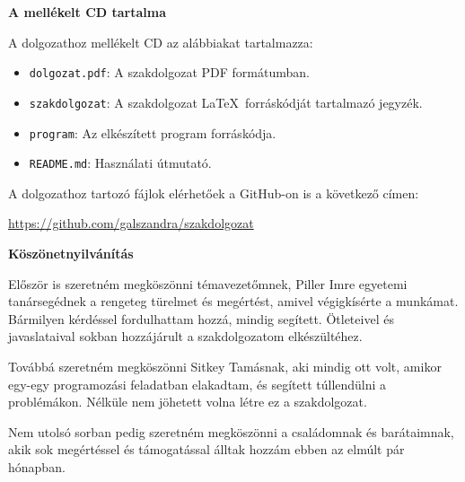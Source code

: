 \pagestyle{empty}

\noindent \textbf{\Large A mellékelt CD tartalma}

\vskip 1cm

\noindent A dolgozathoz mellékelt CD az alábbiakat tartalmazza:
\begin{itemize}
\item\texttt{dolgozat.pdf}: A szakdolgozat PDF formátumban.
\item\texttt{szakdolgozat}: A szakdolgozat \LaTeX\ forráskódját tartalmazó jegyzék.
\item\texttt{program}: Az elkészített program forráskódja. 
\item\texttt{README.md}: Használati útmutató.
\end{itemize}

\medskip

\noindent A dolgozathoz tartozó fájlok elérhetőek a GitHub-on is a következő címen:

\medskip

\quad \url{https://github.com/galszandra/szakdolgozat}

\newpage

\begin{LARGE}
	\textbf{Köszönetnyilvánítás}
\end{LARGE}
\vskip 1cm

Először is szeretném megköszönni témavezetőmnek, Piller Imre egyetemi tanársegédnek a rengeteg türelmet és megértést, amivel végigkísérte a munkámat. Bármilyen kérdéssel fordulhattam hozzá, mindig segített. Ötleteivel és javaslataival sokban hozzájárult a szakdolgozatom elkészültéhez.

Továbbá szeretném megköszönni Sitkey Tamásnak, aki mindig ott volt, amikor egy-egy programozási feladatban elakadtam, és segített túllendülni a problémákon. Nélküle nem jöhetett volna létre ez a szakdolgozat.

Nem utolsó sorban pedig szeretném megköszönni a családomnak és barátaimnak, akik sok megértéssel és támogatással álltak hozzám ebben az elmúlt pár hónapban.
